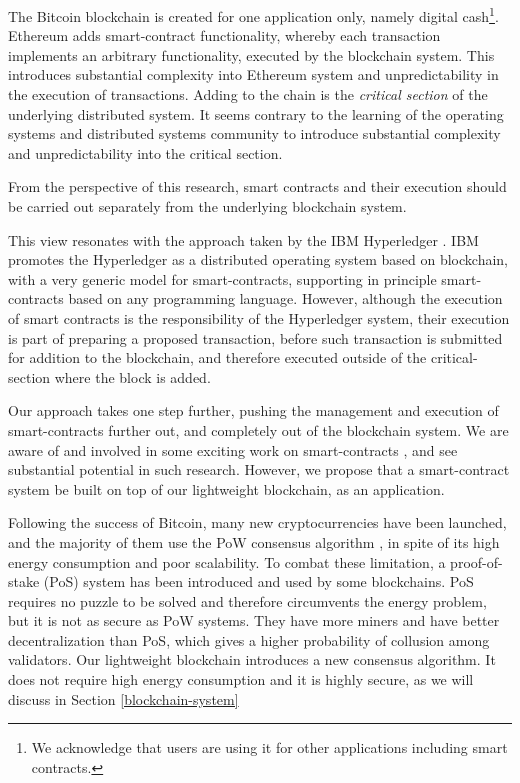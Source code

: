 \documentclass[10pt]{article}
\begin{document}
The Bitcoin blockchain is created for one application only, namely digital cash\footnote{We acknowledge that users are using it for other applications including smart contracts.}. Ethereum \cite{ethereum} adds smart-contract functionality, whereby each transaction implements an arbitrary functionality, executed by the blockchain system. This introduces substantial complexity into Ethereum system and unpredictability in the execution of transactions. Adding to the chain is the \emph{critical section} of the underlying distributed system. It seems contrary to the learning of the operating systems and distributed systems community to introduce substantial complexity and unpredictability into the critical section. 

From the perspective of this research, smart contracts and their execution should be carried out separately from the underlying blockchain system. 

This view resonates with the approach taken by the IBM Hyperledger \cite{hyperledger}. IBM promotes the Hyperledger as a distributed operating system based on blockchain, with a very generic model for smart-contracts, supporting in principle smart-contracts based on any programming language. However, although the execution of smart contracts is the responsibility of the Hyperledger system, their execution is part of preparing a proposed transaction, before such transaction is submitted for addition to the blockchain, and therefore executed outside of the critical-section where the block is added.

Our approach takes one step further, pushing the management and execution of smart-contracts further out, and completely out of the blockchain system. We are aware of and involved in some exciting work on smart-contracts%
, and see substantial potential in such research. However, we propose that a smart-contract system be built on top of our lightweight blockchain, as an application.

Following the success of Bitcoin, many new cryptocurrencies have been launched, and the majority of them use the PoW consensus algorithm \cite{sadek2020blockchain}, in spite of its high energy consumption and poor scalability. To combat these limitation, a proof-of-stake (PoS) system has been introduced and used by some blockchains. PoS requires no puzzle to be solved and therefore circumvents the energy problem, but it is not as secure as PoW systems. They have more miners and have better decentralization than PoS, which gives a higher probability of collusion among validators. Our lightweight blockchain introduces a new consensus algorithm. It does not require high energy consumption and it is highly secure, as we will discuss in Section \ref{blockchain-system}
\end{document}
